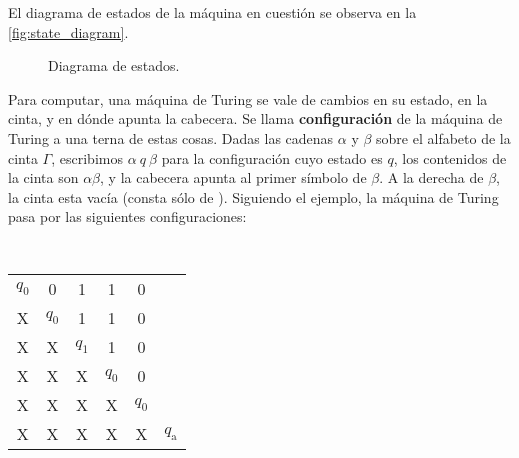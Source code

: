 \documentclass{article}
\theoremstyle{definition}
\begin{document}
El diagrama de estados de la máquina en cuestión se observa en la
\autoref{fig:state_diagram}.

\begin{figure}[ht] %
\centering %
\caption{Diagrama de estados.}\label{fig:state_diagram}
\end{figure}

Para computar, una máquina de Turing se vale de cambios en su estado, en la
cinta, y en dónde apunta la cabecera. Se llama \textbf{configuración} de la
máquina de Turing a una terna de estas cosas. Dadas las cadenas \(\alpha\) y
\(\beta\) sobre el alfabeto de la cinta \(\Gamma\), escribimos \(\alpha~q~\beta\) para
la configuración cuyo estado es \(q\), los contenidos de la cinta son
\(\alpha\beta\), y la cabecera apunta al primer símbolo de \(\beta\). A la derecha
de \(\beta\), la cinta esta vacía (consta sólo de \textvisiblespace). Siguiendo el
ejemplo, la máquina de Turing pasa por las siguientes configuraciones:
\begin{center}
{%
\setlength\tabcolsep{0mm}
\tt
 \begin{tabular}{cccccc}
   \(q_0\) & 0   & 1 & 1 & 0 & \textvisiblespace \\
   X   & \(q_0\) & 1 & 1 & 0 & \textvisiblespace \\
   X   & X & \(q_1\) & 1 & 0 & \textvisiblespace \\
   X   & X & X & \(q_0\) & 0 & \textvisiblespace \\
   X   & X & X & X & \(q_0\) & \textvisiblespace \\
   X   & X & X & X & X & \(q_{\text{a}}\)\\
 \end{tabular}
 }
 \end{center}
\end{document}

